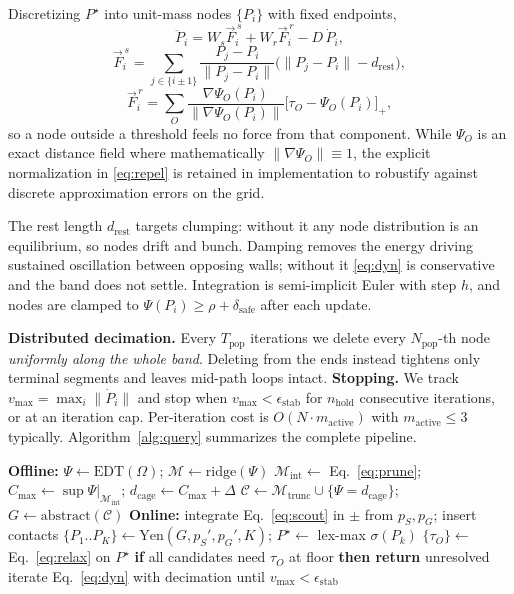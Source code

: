 \documentclass[conference]{IEEEtran}
\begin{document}
Discretizing $P^\star$ into unit-mass nodes $\{P_i\}$ with fixed endpoints,
\begin{equation}
\ddot{P}_i = W_s \vec{F}^{\,s}_i + W_r \vec{F}^{\,r}_i - D\,\dot{P}_i ,
\label{eq:dyn}
\end{equation}
\begin{equation}
\vec{F}^{\,s}_i=\!\!\sum_{j\in\{i\pm1\}}\!\!\frac{P_j-P_i}{\|P_j-P_i\|}\big(\|P_j-P_i\|-d_{\mathrm{rest}}\big),
\end{equation}
\begin{equation}
\vec{F}^{\,r}_i=\sum_{O} \frac{\nabla\Psi_O(P_i)}{\|\nabla\Psi_O(P_i)\|}\big[\tau_O-\Psi_O(P_i)\big]_+ ,
\label{eq:repel}
\end{equation}
so a node outside a threshold feels no force from that component. While $\Psi_O$ is an exact distance field where mathematically $\|\nabla\Psi_O\| \equiv 1$, the explicit normalization in \eqref{eq:repel} is retained in implementation to robustify against discrete approximation errors on the grid. 

The rest length $d_{\mathrm{rest}}$ targets clumping: without it any node distribution is an equilibrium, so nodes drift and bunch. Damping removes the energy driving sustained oscillation between opposing walls; without it \eqref{eq:dyn} is conservative and the band does not settle. Integration is semi-implicit Euler with step $h$, and nodes are clamped to $\Psi(P_i)\ge\rho+\delta_{\mathrm{safe}}$ after each update.

\textbf{Distributed decimation.} Every $T_{\mathrm{pop}}$ iterations we delete every $N_{\mathrm{pop}}$-th node \emph{uniformly along the whole band}. Deleting from the ends instead tightens only terminal segments and leaves mid-path loops intact. \textbf{Stopping.} We track $v_{\max}=\max_i\|\dot{P}_i\|$ and stop when $v_{\max}<\epsilon_{\mathrm{stab}}$ for $n_{\mathrm{hold}}$ consecutive iterations, or at an iteration cap. Per-iteration cost is $O(N\cdot m_{\mathrm{active}})$ with $m_{\mathrm{active}}\le 3$ typically. Algorithm~\ref{alg:query} summarizes the complete pipeline.

\begin{algorithm}[htbp]
\caption{Topological Cage query}
\label{alg:query}
\begin{algorithmic}[1]
\STATE \textbf{Offline:} $\Psi\!\leftarrow\!\mathrm{EDT}(\Omega)$; $\mathcal{M}\!\leftarrow\!\mathrm{ridge}(\Psi)$
\STATE $\mathcal{M}_{\mathrm{int}}\!\leftarrow\!$ Eq.~\eqref{eq:prune}; $C_{\max}\!\leftarrow\!\sup\Psi|_{\mathcal{M}_{\mathrm{int}}}$; $d_{\mathrm{cage}}\!\leftarrow\!C_{\max}\!+\!\Delta$
\STATE $\mathcal{C}\!\leftarrow\!\mathcal{M}_{\mathrm{trunc}}\cup\{\Psi\!=\!d_{\mathrm{cage}}\}$; $G\!\leftarrow\!\mathrm{abstract}(\mathcal{C})$
\STATE \textbf{Online:} integrate Eq.~\eqref{eq:scout} in $\pm$ from $p_S,p_G$; insert contacts
\STATE $\{P_1..P_K\}\leftarrow\mathrm{Yen}(G,p_S',p_G',K)$; $P^\star\leftarrow$ lex-max $\sigma(P_k)$
\STATE $\{\tau_O\}\leftarrow$ Eq.~\eqref{eq:relax} on $P^\star$
\STATE \textbf{if} all candidates need $\tau_O$ at floor \textbf{then return} unresolved
\STATE iterate Eq.~\eqref{eq:dyn} with decimation until $v_{\max}<\epsilon_{\mathrm{stab}}$
\end{algorithmic}
\end{algorithm}
\end{document}
